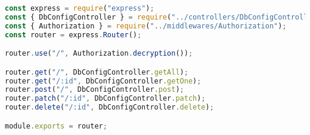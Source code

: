 \begin{lstlisting}[language=Javascript,caption={Database Config Route}]
const express = require("express");
const { DbConfigController } = require("../controllers/DbConfigController");
const { Authorization } = require("../middlewares/Authorization");
const router = express.Router();

router.use("/", Authorization.decryption());

router.get("/", DbConfigController.getAll);
router.get("/:id", DbConfigController.getOne);
router.post("/", DbConfigController.post);
router.patch("/:id", DbConfigController.patch);
router.delete("/:id", DbConfigController.delete);

module.exports = router;
\end{lstlisting}